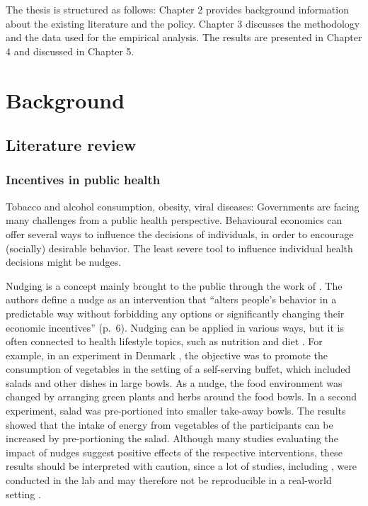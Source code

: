 \documentclass{scrbook}
\begin{document}
The thesis is structured as follows: Chapter 2 provides background
information about the existing literature and the policy. Chapter 3
discusses the methodology and the data used for the empirical analysis.
The results are presented in Chapter 4 and discussed in Chapter 5.

\chapter{Background}

\section{Literature review}

\subsection*{Incentives in public health}

Tobacco and alcohol consumption, obesity, viral diseases: Governments
are facing many challenges from a public health perspective. Behavioural
economics can offer several ways to influence the decisions of
individuals, in order to encourage (socially) desirable behavior. The
least severe tool to influence individual health decisions might be
nudges.

Nudging is a concept mainly brought to the public through the work of
\textcite{thaler_nudge_2008}. The authors define a nudge as an
intervention that ``alters people's behavior in a predictable way
without forbidding any options or significantly changing their economic
incentives'' (p.~6). Nudging can be applied in various ways, but it is
often connected to health lifestyle topics, such as nutrition and diet
\parencite{ledderer_nudging_2020}. For example, in an experiment in
Denmark \parencite{friis_comparison_2017}, the objective was to promote
the consumption of vegetables in the setting of a self-serving buffet,
which included salads and other dishes in large bowls. As a nudge, the
food environment was changed by arranging green plants and herbs around
the food bowls. In a second experiment, salad was pre-portioned into
smaller take-away bowls. The results showed that the intake of energy
from vegetables of the participants can be increased by pre-portioning
the salad. Although many studies evaluating the impact of nudges suggest
positive effects of the respective interventions, these results should
be interpreted with caution, since a lot of studies, including
\textcite{friis_comparison_2017}, were conducted in the lab and may
therefore not be reproducible in a real-world setting
\parencite{ledderer_nudging_2020}.
\end{document}

